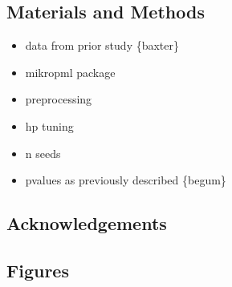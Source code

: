 \documentclass[]{article}
\begin{document}
\newpage

\subsection{Materials and Methods}\label{materials-and-methods}

\begin{itemize}
\itemsep1pt\parskip0pt
\item
  data from prior study \{baxter\}
\item
  mikropml package
\item
  preprocessing
\item
  hp tuning
\item
  n seeds
\item
  pvalues as previously described \{begum\}
\end{itemize}

\newpage

\subsection{Acknowledgements}\label{acknowledgements}

\newpage

\subsection{Figures}\label{figures}
\end{document}
